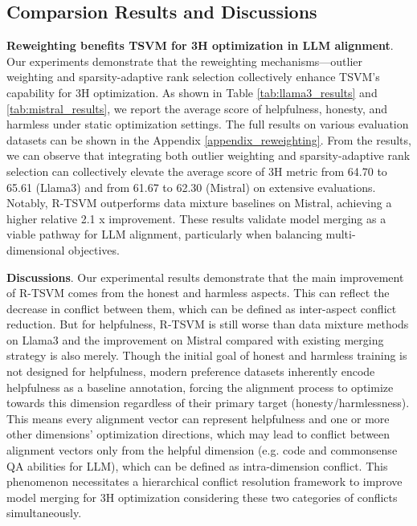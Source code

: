 \subsection{Comparsion Results and Discussions}

\textbf{Reweighting benefits TSVM for 3H optimization in LLM alignment}.
Our experiments demonstrate that the reweighting mechanisms—outlier weighting and sparsity-adaptive rank selection collectively enhance TSVM's capability for 3H optimization. As shown in Table \ref{tab:llama3_results} and \ref{tab:mistral_results}, we report the average score of helpfulness, honesty, and harmless under static optimization settings. The full results on various evaluation datasets can be shown in the Appendix \ref{appendix_reweighting}. From the results, we can observe that integrating both outlier weighting and sparsity-adaptive rank selection can collectively elevate the average score of 3H metric from 64.70 to 65.61 (Llama3) and from 61.67 to 62.30 (Mistral) on extensive evaluations. Notably, R-TSVM outperforms data mixture baselines on Mistral, achieving a higher relative 2.1 x improvement. These results validate model merging as a viable pathway for LLM alignment, particularly when balancing multi-dimensional objectives.

\textbf{Discussions}.
Our experimental results demonstrate that the main improvement of R-TSVM comes from the honest and harmless aspects. This can reflect the decrease in conflict between them, which can be defined as inter-aspect conflict reduction. But for helpfulness, R-TSVM is still worse than data mixture methods on Llama3 and the improvement on Mistral compared with existing merging strategy is also merely. Though the initial goal of honest and harmless training is not designed for helpfulness, modern preference datasets inherently encode helpfulness as a baseline annotation, forcing the alignment process to optimize towards this dimension regardless of their primary target (honesty/harmlessness). This means every alignment vector can represent helpfulness and one or more other dimensions' optimization directions, which may lead to conflict between alignment vectors only from the helpful dimension (e.g. code and commonsense QA abilities for LLM), which can be defined as intra-dimension conflict. This phenomenon necessitates a hierarchical conflict resolution framework to improve model merging for 3H optimization considering these two categories of conflicts simultaneously.




